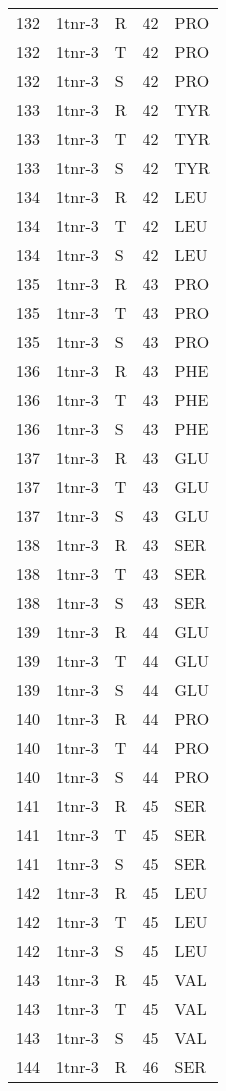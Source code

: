 \begin{longtable}[l]{l|l|l|l|l}
	132 & 1tnr-3 & R & 42 & PRO \\
	132 & 1tnr-3 & T & 42 & PRO \\
	132 & 1tnr-3 & S & 42 & PRO \\
	133 & 1tnr-3 & R & 42 & TYR \\
	133 & 1tnr-3 & T & 42 & TYR \\
	133 & 1tnr-3 & S & 42 & TYR \\
	134 & 1tnr-3 & R & 42 & LEU \\
	134 & 1tnr-3 & T & 42 & LEU \\
	134 & 1tnr-3 & S & 42 & LEU \\
	135 & 1tnr-3 & R & 43 & PRO \\
	135 & 1tnr-3 & T & 43 & PRO \\
	135 & 1tnr-3 & S & 43 & PRO \\
	136 & 1tnr-3 & R & 43 & PHE \\
	136 & 1tnr-3 & T & 43 & PHE \\
	136 & 1tnr-3 & S & 43 & PHE \\
	137 & 1tnr-3 & R & 43 & GLU \\
	137 & 1tnr-3 & T & 43 & GLU \\
	137 & 1tnr-3 & S & 43 & GLU \\
	138 & 1tnr-3 & R & 43 & SER \\
	138 & 1tnr-3 & T & 43 & SER \\
	138 & 1tnr-3 & S & 43 & SER \\
	139 & 1tnr-3 & R & 44 & GLU \\
	139 & 1tnr-3 & T & 44 & GLU \\
	139 & 1tnr-3 & S & 44 & GLU \\
	140 & 1tnr-3 & R & 44 & PRO \\
	140 & 1tnr-3 & T & 44 & PRO \\
	140 & 1tnr-3 & S & 44 & PRO \\
	141 & 1tnr-3 & R & 45 & SER \\
	141 & 1tnr-3 & T & 45 & SER \\
	141 & 1tnr-3 & S & 45 & SER \\
	142 & 1tnr-3 & R & 45 & LEU \\
	142 & 1tnr-3 & T & 45 & LEU \\
	142 & 1tnr-3 & S & 45 & LEU \\
	143 & 1tnr-3 & R & 45 & VAL \\
	143 & 1tnr-3 & T & 45 & VAL \\
	143 & 1tnr-3 & S & 45 & VAL \\
	144 & 1tnr-3 & R & 46 & SER \\

\end{longtable}
